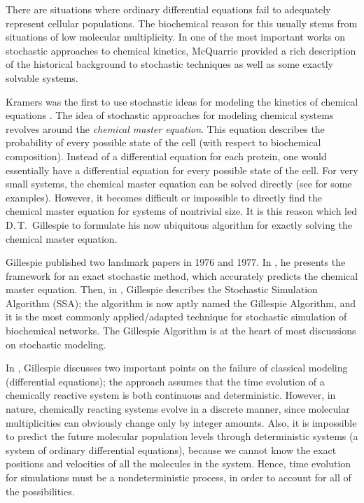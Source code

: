 \documentclass[copyright]{eptcs}
\begin{document}
There are situations where ordinary differential equations fail to adequately represent cellular populations.  The biochemical reason for this usually stems from situations of low molecular multiplicity.  In one of the most important works on stochastic approaches to chemical kinetics, McQuarrie \cite{mcquarrie67} provided a rich description of the historical background to stochastic techniques as well as some exactly solvable systems.

Kramers was the first to use stochastic ideas for modeling the kinetics of chemical equations \cite{kramers40,montroll58}.  The idea of stochastic approaches for modeling chemical systems revolves around the \emph{chemical master equation}.  This equation describes the probability of every possible state of the cell (with respect to biochemical composition).  Instead of a differential equation for each protein, one would essentially have a differential equation for every possible state of the cell.
For very small systems, the chemical master equation can be solved directly (see \cite{mcquarrie67} for some examples).  However, it becomes difficult or impossible to directly find the chemical master equation for systems of nontrivial size.  It is this reason which led D.\,T.~Gillespie to formulate his now ubiquitous algorithm for exactly solving the chemical master equation.

Gillespie published two landmark papers in 1976 and 1977.  In \cite{gillesp76}, he presents the framework for an exact stochastic method, which accurately predicts the chemical master equation.  Then, in \cite{gillesp77}, Gillespie describes the Stochastic Simulation Algorithm (SSA); the algorithm is now aptly named the Gillespie Algorithm, and it is the most commonly applied/adapted technique for stochastic simulation of biochemical networks.  The Gillespie Algorithm is at the heart of most discussions on stochastic modeling.

In \cite{gillesp77}, Gillespie discusses two important points on the failure of classical modeling (differential equations); the approach assumes that the time evolution of a chemically reactive system is both continuous and deterministic.  However, in nature, chemically reacting systems evolve in a discrete manner, since molecular multiplicities can obviously change only by integer amounts.  Also, it is impossible to predict the future molecular population levels through deterministic systems (a system of ordinary differential equations), because we cannot know the exact positions and velocities of all the molecules in the system.  Hence, time evolution for simulations must be a nondeterministic process, in order to account for all of the possibilities.
\end{document}
